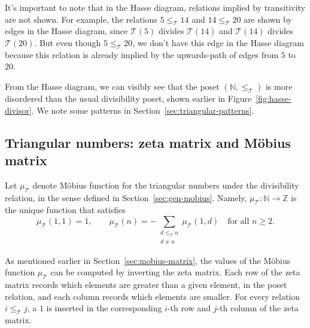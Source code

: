 \documentclass{amsart}
\theoremstyle{definition}
\newcommand{\NN}{\mathbb{N}}
\newcommand{\ZZ}{\mathbb{Z}}
\newcommand{\Mobius}{M\"obius}
\newcommand{\leqtri}{\leq_{\tri}}
\newcommand{\mutri}{\mu_{\tri}}
\newcommand{\tri}{\mathcal T}
\begin{document}
It's important to note that in the Hasse diagram, relations implied by transitivity are not shown.
For example, the relations $5 \leqtri 14$ and $14 \leqtri 20$ are shown by edges in the Hasse diagram, since $\tri(5)$ divides $\tri(14)$ and $\tri(14)$ divides $\tri(20)$. 
But even though $5 \leqtri 20$, we don't have this edge in the Hasse diagram because this relation is already implied by 
the upwards-path of edges from $5$ to $20$.



From the Hasse diagram, we can visibly see that the poset $(\NN, \leqtri)$ is more disordered than the usual divisibility poset, shown earlier in Figure~\ref{fig:hasse-divisor}.
We note some patterns in Section~\ref{sec:triangular-patterns}.

\subsection{Triangular numbers: zeta matrix and \Mobius{} matrix}
\label{sec:tri-matrices}

Let $\mutri$ denote \Mobius{} function for the triangular numbers under the divisibility relation, in the sense defined in Section~\ref{sec:gen-mobius}.
Namely, $\mutri: \NN \to \ZZ$ is the unique function that satisfies
\begin{equation}
    \mutri(1, 1) = 1,
    \qquad 
    \mutri(n) = -\sum_{\substack{d \leqtri n \\[0.2em] d \neq n}} \mutri(1, d) \quad\text{for all } n \geq 2.
\end{equation}

As mentioned earlier in Section~\ref{sec:mobius-matrix}, the values of the \Mobius{} function $\mutri$ can be computed by inverting the zeta matrix.
Each row of the zeta matrix records which elements are greater than a given element, in the poset relation, and each column records which elements are smaller.
For every relation $i \leqtri j$, a $1$ is inserted in the corresponding $i$-th row and $j$-th column of the zeta matrix. 
\end{document}
